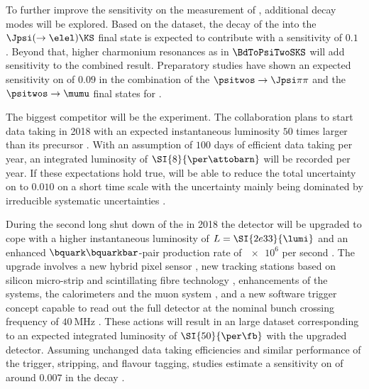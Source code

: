 To further improve the sensitivity on the measurement of \sintwobeta, additional
decay modes will be explored. Based on the \RunOne dataset, the decay of the \Bd
into the $\Jpsi (\to\elel) \KS$ final state is expected to contribute with a
sensitivity of $\num{0.1}$ \cite{bdtojpsieeks:ramon}. Beyond that, higher
charmonium resonances as in $\BdToPsiTwoSKS$ will add sensitivity to the
combined result. Preparatory studies have shown an expected sensitivity on
\sintwobeta of $\num{0.09}$ in the combination of the $\psitwos\to\Jpsi\pi\pi$
and the $\psitwos\to\mumu$ final states for \RunOne \cite{Mueller:2014}.

The biggest \LHCb competitor will be the \BelleTwo experiment. The collaboration
plans to start data taking in 2018 with an expected instantaneous luminosity
$\num{50}$ times larger than its precursor \Belle. With an assumption of
$\num{100}$ days of efficient data taking per year, an integrated luminosity of
$\SI{8}{\per\attobarn}$ will be recorded per year. If these expectations hold
true, \BelleTwo will be able to reduce the total uncertainty on \sintwobeta to
$\num{0.010}$ on a short time scale with the uncertainty mainly being dominated
by irreducible systematic uncertainties \cite{Aushev:2010bq}.

During the second long shut down of the \LHC in 2018 the \LHCb detector will be
upgraded to cope with a higher instantaneous luminosity of $L =
\SI{2e33}{\lumi}$ and an enhanced $\bquark\bquarkbar$-pair production rate of
$\num{e6}$ per second \cite{Bediaga:1443882}. The upgrade involves a new hybrid
pixel sensor \VELO \cite{TDRVELO}, new tracking stations based on silicon
micro-strip and scintillating fibre technology \cite{TDRTracking}, enhancements
of the \RICH systems, the calorimeters and the muon system \cite{TDRPID}, and a
new software trigger concept capable to read out the full detector at the
nominal bunch crossing frequency of $\SI{40}{\mega\hertz}$ \cite{TDRTrigger}.
These actions will result in an large dataset corresponding to an expected
integrated luminosity of $\SI{50}{\per\fb}$ with the upgraded detector. Assuming
unchanged data taking efficiencies and similar performance of the trigger,
stripping, and flavour tagging, \ToyMC studies estimate a sensitivity on
\sintwobeta of around $\num{0.007}$ \cite{Moedden:2015} in the decay
\BdToJpsiKS.
